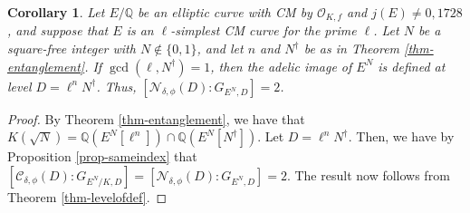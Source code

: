 \documentclass[11pt]{amsart}
\newtheorem{corollary}[defn]{Corollary}
\theoremstyle{definition}
\newcommand{\Q}{\mathbb{Q}}
\newcommand{\Of}{\mathcal{O}_{K,f}}
\begin{document}
\begin{corollary}\label{cor-levelofdef}
    Let $E/\Q$ be an elliptic curve with CM by $\Of$ and $j(E) \neq 0, 1728$, and suppose that $E$ is an $\ell$-simplest CM curve for the prime $\ell$. Let $N$ be a square-free integer with $N \notin \{0, 1\}$, and let $n$ and $N^\dagger$ be as in Theorem \ref{thm-entanglement}. If $\gcd(\ell, N^\dagger) = 1$, then the adelic image of $E^N$ is defined at level $D=\ell^n N^\dagger$. Thus, $[\mathcal{N}_{\delta, \phi}(D) : G_{E^N, D}] = 2$.
\end{corollary}

\begin{proof}
    By Theorem \ref{thm-entanglement}, we have that $K(\sqrt{N}) = \Q(E^{N}[\ell^n]) \cap \Q(E^{N}[N^\dagger])$. Let $D=\ell^n N^\dagger$. Then, we have by Proposition \ref{prop-sameindex} that $[\mathcal{C}_{\delta, \phi}(D) : G_{E^N/K, D}] = [\mathcal{N}_{\delta, \phi}(D) : G_{E^N, D}] = 2$. The result now follows from Theorem \ref{thm-levelofdef}. 
\end{proof}



\end{document}
